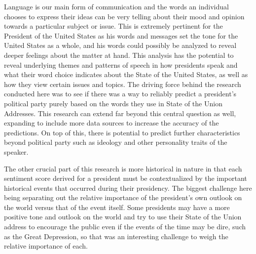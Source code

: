 Language is our main form of communication and the words an individual chooses to express their ideas can be very telling about their mood and opinion towards a particular subject or issue.
This is extremely pertinent for the President of the United States as his words and messages set the tone for the United States as a whole, and his words could possibly be analyzed to reveal deeper feelings about the matter at hand.
This analysis has the potential to reveal underlying themes and patterns of speech in how presidents speak and what their word choice indicates about the State of the United States, as well as how they view certain issues and topics.
The driving force behind the research conducted here was to see if there was a way to reliably predict a president's political party purely based on the words they use in State of the Union Addresses.
This research can extend far beyond this central question as well, expanding to include more data sources to increase the accuracy of the predictions.
On top of this, there is potential to predict further characteristics beyond political party such as ideology and other personality traits of the speaker.

The other crucial part of this research is more historical in nature in that each sentiment score derived for a president must be contextualized by the important historical events that occurred during their presidency.
The biggest challenge here being separating out the relative importance of the president's own outlook on the world versus that of the event itself.
Some presidents may have a more positive tone and outlook on the world and try to use their State of the Union address to encourage the public even if the events of the time may be dire, such as the Great Depression, so that was an interesting challenge to weigh the relative importance of each.